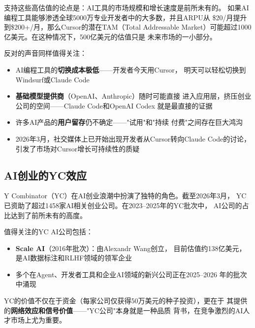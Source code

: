 支持这些高估值的论点是：AI工具的市场规模和增长速度是前所未有的。
如果AI编程工具能够渗透全球5000万专业开发者中的大多数，并且ARPU从
\$20/月提升到\$200+/月，那么Cursor的潜在TAM（Total Addressable
Market）可能超过1000亿美元。在这种情况下，500亿美元的估值只是
未来市场的一小部分。

\begin{whybox}[估值的另一面]
反对的声音同样值得关注：
\begin{itemize}
  \item AI编程工具的\textbf{切换成本极低}——开发者今天用Cursor，
    明天可以轻松切换到Windsurf或Claude Code
  \item \textbf{基础模型提供商}（OpenAI、Anthropic）随时可能直接
    进入应用层，挤压创业公司的空间——Claude Code和OpenAI Codex
    就是最直接的证据
  \item 许多AI产品的\textbf{用户留存}仍不确定——"试用"和"持续
    付费"之间存在巨大鸿沟
  \item 2026年3月，社交媒体上已开始出现开发者从Cursor转向Claude
    Code的讨论，引发了市场对Cursor增长可持续性的质疑
\end{itemize}
\end{whybox}

\subsection{AI创业的YC效应}
\label{subsec:founders-yc}

Y Combinator（YC）在AI创业浪潮中扮演了独特的角色。截至2026年3月，
YC已资助了超过1458家AI相关创业公司。在2023--2025年的YC批次中，
AI公司的占比达到了前所未有的高度。

值得关注的YC AI公司包括：

\begin{itemize}
  \item \textbf{Scale AI}（2016年批次）：由Alexandr Wang创立，
    目前估值约138亿美元，是AI数据标注和RLHF领域的领军企业
  \item 多个在Agent、开发者工具和企业AI领域的新兴公司正在2025--2026
    年的批次中涌现
\end{itemize}

YC的价值不仅在于资金（每家公司仅获得50万美元的种子投资），更在于
其提供的\textbf{网络效应和信号价值}——"YC公司"本身就是一种品质
背书，在竞争激烈的AI人才市场上尤为重要。

